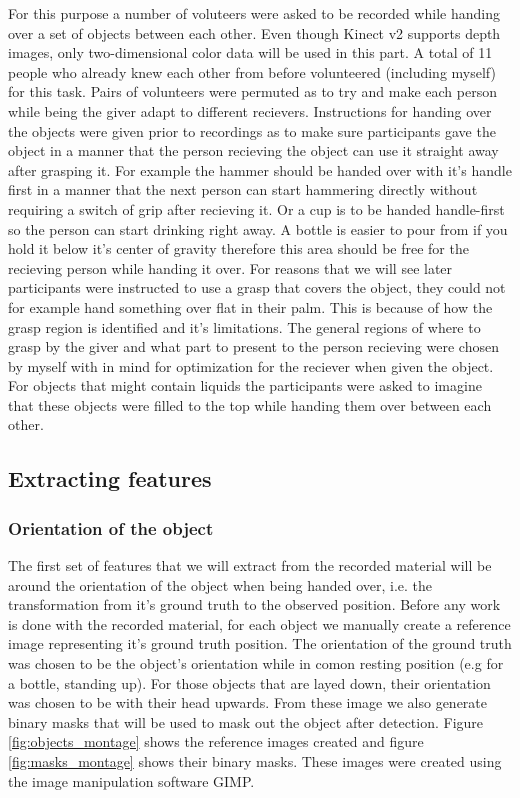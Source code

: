 For this purpose a number of voluteers were asked to be recorded while handing over a set of objects between each other. Even though Kinect v2 supports depth images, only two-dimensional color data will be used in this part. A total of 11 people who already knew each other from before volunteered (including myself) for this task. Pairs of volunteers were permuted as to try and make each person while being the giver adapt to different recievers. Instructions for handing over the objects were given prior to recordings as to make sure participants gave the object in a manner that the person recieving the object can use it straight away after grasping it. For example the hammer should be handed over with it's handle first in a manner that the next person can start hammering directly without requiring a switch of grip after recieving it. Or a cup is to be handed handle-first so the person can start drinking right away. A bottle is easier to pour from if you hold it below it's center of gravity therefore this area should be free for the recieving person while handing it over. For reasons that we will see later participants were instructed to use a grasp that covers the object, they could not for example hand something over flat in their palm. This is because of how the grasp region is identified and it's limitations. The general regions of where to grasp by the giver and what part to present to the person recieving were chosen by myself with in mind for optimization for the reciever when given the object. For objects that might contain liquids the participants were asked to imagine that these objects were filled to the top while handing them over between each other.

\subsection{Extracting features}


\subsubsection{Orientation of the object}

The first set of features that we will extract from the recorded material will be around the orientation of the object when being handed over, i.e. the transformation from it's ground truth to the observed position. Before any work is done with the recorded material, for each object we manually create a reference image representing it's ground truth position. The orientation of the ground truth was chosen to be the object's orientation while in comon resting position (e.g for a bottle, standing up). For those objects that are layed down, their orientation was chosen to be with their head upwards. From these image we also generate binary masks that will be used to mask out the object after detection. Figure \ref{fig:objects_montage} shows the reference images created and figure \ref{fig:masks_montage} shows their binary masks. These images were created using the image manipulation software GIMP.

